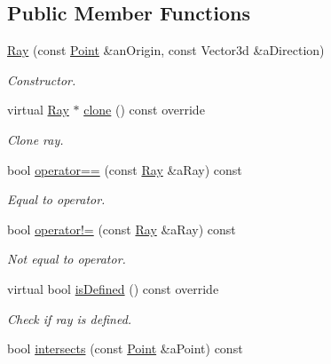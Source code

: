 \subsection*{Public Member Functions}
\begin{DoxyCompactItemize}
\item 
\hyperlink{classostk_1_1math_1_1geom_1_1d3_1_1objects_1_1_ray_a78335698f8a4f72e613e607b13121df0}{Ray} (const \hyperlink{classostk_1_1math_1_1geom_1_1d3_1_1objects_1_1_point}{Point} \&an\+Origin, const Vector3d \&a\+Direction)
\begin{DoxyCompactList}\small\item\em Constructor. \end{DoxyCompactList}\item 
virtual \hyperlink{classostk_1_1math_1_1geom_1_1d3_1_1objects_1_1_ray}{Ray} $\ast$ \hyperlink{classostk_1_1math_1_1geom_1_1d3_1_1objects_1_1_ray_aef341aa921aa184e1193c782e9198230}{clone} () const override
\begin{DoxyCompactList}\small\item\em Clone ray. \end{DoxyCompactList}\item 
bool \hyperlink{classostk_1_1math_1_1geom_1_1d3_1_1objects_1_1_ray_ad261573a0f3538dae39cd28c7d9a7dd2}{operator==} (const \hyperlink{classostk_1_1math_1_1geom_1_1d3_1_1objects_1_1_ray}{Ray} \&a\+Ray) const
\begin{DoxyCompactList}\small\item\em Equal to operator. \end{DoxyCompactList}\item 
bool \hyperlink{classostk_1_1math_1_1geom_1_1d3_1_1objects_1_1_ray_a9167ca5a0a3ad5a8c5e156231838aef3}{operator!=} (const \hyperlink{classostk_1_1math_1_1geom_1_1d3_1_1objects_1_1_ray}{Ray} \&a\+Ray) const
\begin{DoxyCompactList}\small\item\em Not equal to operator. \end{DoxyCompactList}\item 
virtual bool \hyperlink{classostk_1_1math_1_1geom_1_1d3_1_1objects_1_1_ray_ac0d991765b5d91a978fda87696b8069d}{is\+Defined} () const override
\begin{DoxyCompactList}\small\item\em Check if ray is defined. \end{DoxyCompactList}\item 
bool \hyperlink{classostk_1_1math_1_1geom_1_1d3_1_1objects_1_1_ray_aef14073eca198acde6dd1fe080939e42}{intersects} (const \hyperlink{classostk_1_1math_1_1geom_1_1d3_1_1objects_1_1_point}{Point} \&a\+Point) const

\end{DoxyCompactItemize}
